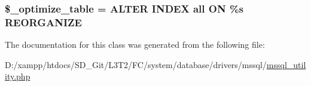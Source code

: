 \subsubsection[{\$\+\_\+optimize\+\_\+table}]{\setlength{\rightskip}{0pt plus 5cm}\$\+\_\+optimize\+\_\+table = \textquotesingle{}A\+L\+T\+E\+R I\+N\+D\+E\+X {\bf all} O\+N \%s R\+E\+O\+R\+G\+A\+N\+I\+Z\+E\textquotesingle{}\hspace{0.3cm}{\ttfamily [protected]}}\label{class_c_i___d_b__mssql__utility_a083199e5c22c78912dae0a47bb2d7fad}


The documentation for this class was generated from the following file\+:\begin{DoxyCompactItemize}
\item 
D\+:/xampp/htdocs/\+S\+D\+\_\+\+Git/\+L3\+T2/\+F\+C/system/database/drivers/mssql/\hyperlink{mssql__utility_8php}{mssql\+\_\+utility.\+php}\end{DoxyCompactItemize}
